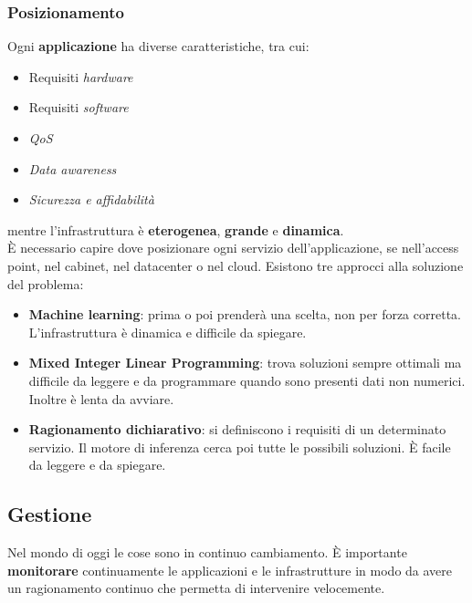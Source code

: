 \subsubsection{Posizionamento}
Ogni \textbf{applicazione} ha diverse caratteristiche, tra cui:
\begin{itemize}
	\item Requisiti \textit{hardware}
	\item Requisiti \textit{software}
	\item \textit{QoS}
	\item \textit{Data awareness}
	\item \textit{Sicurezza e affidabilità}
\end{itemize}
mentre l'infrastruttura è \textbf{eterogenea}, \textbf{grande} e \textbf{dinamica}.\\
È necessario capire dove posizionare ogni servizio dell'applicazione, se nell'access point, nel cabinet, nel datacenter o nel cloud. Esistono tre approcci alla soluzione del problema:
\begin{itemize}
	\item \textbf{Machine learning}: prima o poi prenderà una scelta, non per forza corretta. L'infrastruttura è dinamica e difficile da spiegare.
	\item \textbf{Mixed Integer Linear Programming}: trova soluzioni sempre ottimali ma difficile da leggere e da programmare quando sono presenti dati non numerici. Inoltre è lenta da avviare.
	\item \textbf{Ragionamento dichiarativo}: si definiscono i requisiti di un determinato servizio. Il motore di inferenza cerca poi tutte le possibili soluzioni. È facile da leggere e da spiegare.
\end{itemize}

\subsection{Gestione}
Nel mondo di oggi le cose sono in continuo cambiamento. È importante \textbf{monitorare} continuamente le applicazioni e le infrastrutture in modo da avere un ragionamento continuo che permetta di intervenire velocemente.